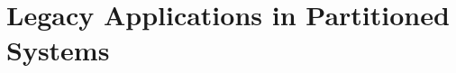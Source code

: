 \declarecommand{\sysname}{\graphene{}}

\chapter{Legacy Applications in Partitioned Systems}
\label{chap:graphene}












